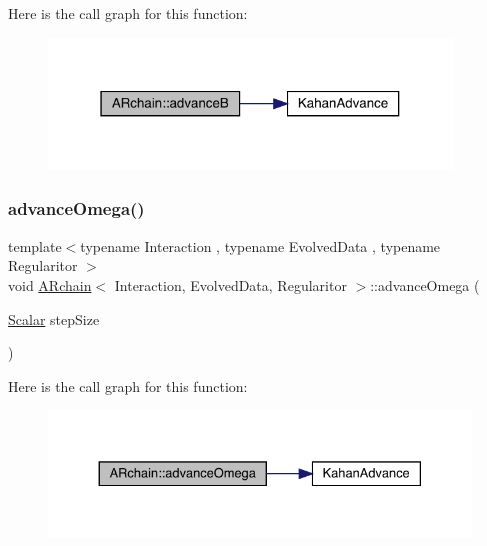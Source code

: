 Here is the call graph for this function\+:
\nopagebreak
\begin{figure}[H]
\begin{center}
\leavevmode
\includegraphics[width=304pt]{class_a_rchain_a1b2ae6231caeba3df20e4ab41f63a4b8_cgraph}
\end{center}
\end{figure}
\mbox{\label{class_a_rchain_ac54722bde3c9a15e04dd004ebcf0db5e}} 
\subsubsection{\texorpdfstring{advance\+Omega()}{advanceOmega()}}
{\footnotesize\ttfamily template$<$typename Interaction , typename Evolved\+Data , typename Regularitor $>$ \\
void \mbox{\hyperlink{class_a_rchain}{A\+Rchain}}$<$ Interaction, Evolved\+Data, Regularitor $>$\+::advance\+Omega (\begin{DoxyParamCaption}\item[{\mbox{\hyperlink{class_a_rchain_a707e42a79e4744424a34c9007e84ee07}{Scalar}}}]{step\+Size }\end{DoxyParamCaption})\hspace{0.3cm}{\ttfamily [private]}}

Here is the call graph for this function\+:
\nopagebreak
\begin{figure}[H]
\begin{center}
\leavevmode
\includegraphics[width=330pt]{class_a_rchain_ac54722bde3c9a15e04dd004ebcf0db5e_cgraph}
\end{center}
\end{figure}
\mbox{\label{class_a_rchain_a8d3ac75a6b4231e0859492257553316e}} 
